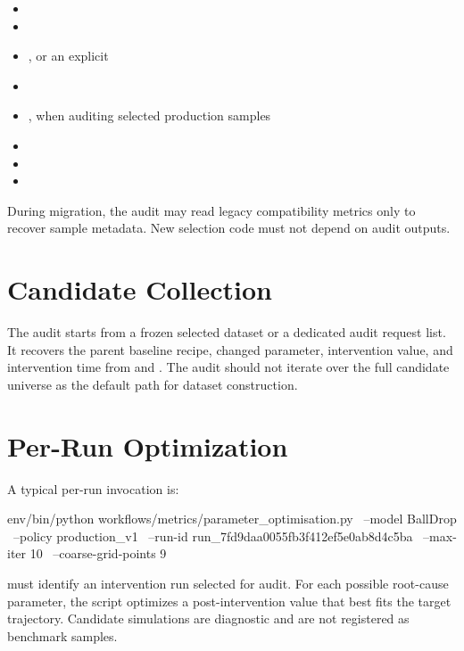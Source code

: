 \documentclass[11pt]{article}
\begin{document}
\begin{itemize}
\item {}
\item {}
\item {}, or an explicit 
\item {}
\item {}, when auditing selected production samples
\item {}
\item {}
\item {}
\end{itemize}

During migration, the audit may read legacy compatibility metrics only to recover sample metadata.
New selection code must not depend on audit outputs.

\section*{Candidate Collection}

The audit starts from a frozen selected dataset or a dedicated audit request list.
It recovers the parent baseline recipe, changed parameter, intervention value, and intervention time from  and .
The audit should not iterate over the full candidate universe as the default path for dataset construction.

\section*{Per-Run Optimization}

A typical per-run invocation is:

\begin{DocCode}
env/bin/python workflows/metrics/parameter_optimisation.py \
  --model BallDrop \
  --policy production_v1 \
  --run-id run_7fd9daa0055fb3f412ef5e0ab8d4c5ba \
  --max-iter 10 \
  --coarse-grid-points 9
\end{DocCode}

\code{RUN_ID} must identify an intervention run selected for audit.
For each possible root-cause parameter, the script optimizes a post-intervention value that best fits the target trajectory.
Candidate simulations are diagnostic and are not registered as benchmark samples.
\end{document}
